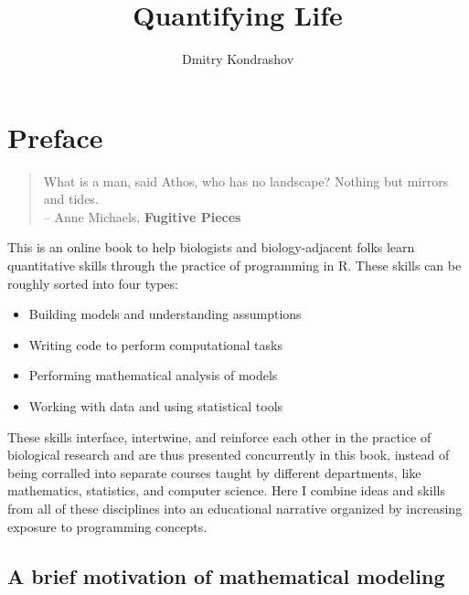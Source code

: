 \documentclass[
  letterpaper,
  DIV=11,
  numbers=noendperiod]{scrreprt}
\title{Quantifying Life}
\author{Dmitry Kondrashov}
\date{}
\renewcommand*\contentsname{Table of contents}
\newcommand\contentsname{Table of contents}
\begin{document}
\maketitle
\ifdefined\Shaded\renewenvironment{Shaded}{\begin{tcolorbox}[breakable, enhanced, borderline west={3pt}{0pt}{shadecolor}, interior hidden, boxrule=0pt, frame hidden, sharp corners]}{\end{tcolorbox}}\fi

\renewcommand*\contentsname{Table of contents}
{
\hypersetup{linkcolor=}
\setcounter{tocdepth}{2}
\tableofcontents
}

\hypertarget{preface}{%
\chapter*{Preface}\label{preface}}


\begin{quote}
What is a man, said Athos, who has no landscape? Nothing but mirrors and
tides.\\
-- Anne Michaels, \textbf{Fugitive Pieces}
\end{quote}

This is an online book to help biologists and biology-adjacent folks
learn quantitative skills through the practice of programming in R.
These skills can be roughly sorted into four types:

\begin{itemize}
\item
  Building models and understanding assumptions
\item
  Writing code to perform computational tasks
\item
  Performing mathematical analysis of models
\item
  Working with data and using statistical tools
\end{itemize}

These skills interface, intertwine, and reinforce each other in the
practice of biological research and are thus presented concurrently in
this book, instead of being corralled into separate courses taught by
different departments, like mathematics, statistics, and computer
science. Here I combine ideas and skills from all of these disciplines
into an educational narrative organized by increasing exposure to
programming concepts.

\hypertarget{a-brief-motivation-of-mathematical-modeling}{%
\section*{A brief motivation of mathematical
modeling}\label{a-brief-motivation-of-mathematical-modeling}}
\end{document}
